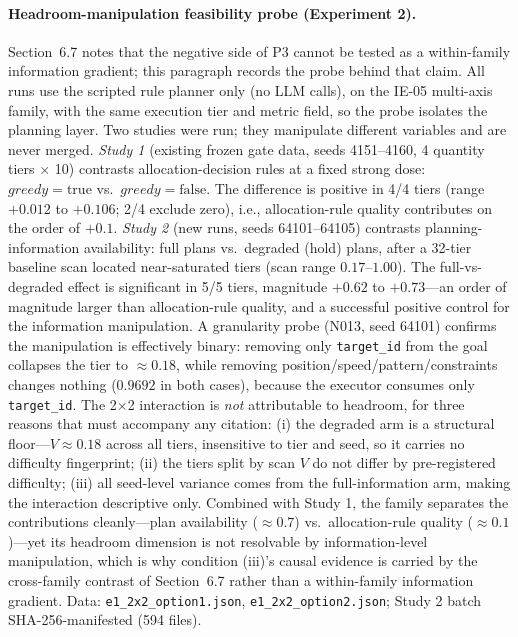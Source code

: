 \documentclass[sigconf,anonymous]{aamas}
\begin{document}
\paragraph{Headroom-manipulation feasibility probe (Experiment 2).}
Section~6.7 notes that the negative side of P3 cannot be tested as a within-family information gradient; this paragraph records the probe behind that claim. All runs use the scripted rule planner only (no LLM calls), on the IE-05 multi-axis family, with the same execution tier and metric field, so the probe isolates the planning layer.
Two studies were run; they manipulate different variables and are never merged. \emph{Study 1} (existing frozen gate data, seeds 4151--4160, 4 quantity tiers $\times$ 10) contrasts allocation-decision rules at a fixed strong dose: $greedy{=}\mathrm{true}$ vs.\ $greedy{=}\mathrm{false}$. The difference is positive in 4/4 tiers (range $+0.012$ to $+0.106$; 2/4 exclude zero), i.e., allocation-rule quality contributes on the order of $+0.1$. \emph{Study 2} (new runs, seeds 64101--64105) contrasts planning-information availability: full plans vs.\ degraded (hold) plans, after a 32-tier baseline scan located near-saturated tiers (scan range $0.17$--$1.00$). The full-vs-degraded effect is significant in 5/5 tiers, magnitude $+0.62$ to $+0.73$---an order of magnitude larger than allocation-rule quality, and a successful positive control for the information manipulation. A granularity probe (N013, seed 64101) confirms the manipulation is effectively binary: removing only \texttt{target\_id} from the goal collapses the tier to $\approx 0.18$, while removing position/speed/pattern/constraints changes nothing ($0.9692$ in both cases), because the executor consumes only \texttt{target\_id}.
The 2$\times$2 interaction is \emph{not} attributable to headroom, for three reasons that must accompany any citation: (i) the degraded arm is a structural floor---$V \approx 0.18$ across all tiers, insensitive to tier and seed, so it carries no difficulty fingerprint; (ii) the tiers split by scan $V$ do not differ by pre-registered difficulty; (iii) all seed-level variance comes from the full-information arm, making the interaction descriptive only. Combined with Study 1, the family separates the contributions cleanly---plan availability ($\approx 0.7$) vs.\ allocation-rule quality ($\approx 0.1$)---yet its headroom dimension is not resolvable by information-level manipulation, which is why condition (iii)'s causal evidence is carried by the cross-family contrast of Section~6.7 rather than a within-family information gradient. Data: \texttt{e1\_2x2\_option1.json}, \texttt{e1\_2x2\_option2.json}; Study 2 batch SHA-256-manifested (594 files).
\end{document}
